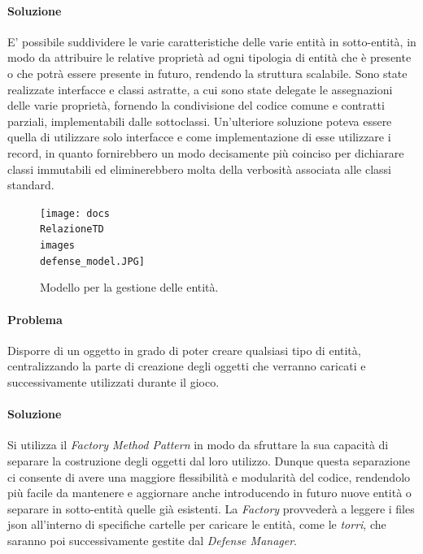 \documentclass[a4paper,12pt]{report}
\begin{document}
\paragraph{Soluzione}
E' possibile suddividere le varie caratteristiche delle varie entità in sotto-entità, in modo da attribuire le relative proprietà ad ogni tipologia di entità che è presente
o che potrà essere presente in futuro, rendendo la struttura scalabile. Sono state realizzate interfacce e classi astratte, a cui sono state delegate le assegnazioni delle varie proprietà, fornendo la condivisione del codice comune e contratti parziali, implementabili dalle sottoclassi.
Un'ulteriore soluzione poteva essere quella di utilizzare solo interfacce e come implementazione di esse utilizzare i record, in quanto fornirebbero un modo decisamente più coinciso per dichiarare classi immutabili ed eliminerebbero molta della verbosità associata alle classi standard.

\begin{figure}[H]
    \centering
    \texttt{[image: docs\\RelazioneTD\\images\\defense\_model.JPG]}
    \caption{Modello per la gestione delle entità.}
    \label{fig:defense-model}
\end{figure}

\vspace{15mm}

\paragraph{Problema}
Disporre di un oggetto in grado di poter creare qualsiasi tipo di entità, centralizzando la parte di creazione degli oggetti che verranno caricati e successivamente utilizzati durante il gioco.

\paragraph{Soluzione}
Si utilizza il \textit{Factory Method Pattern} in modo da sfruttare la sua capacità di separare la costruzione degli oggetti dal loro utilizzo. Dunque questa separazione ci consente di avere una maggiore flessibilità e modularità del codice, rendendolo più facile da mantenere e aggiornare anche introducendo in futuro nuove entità o separare in sotto-entità quelle già esistenti. 
La \textit{Factory} provvederà a leggere i files json all'interno di specifiche cartelle per caricare
le entità, come le \textit{torri}, che saranno poi successivamente gestite dal \textit{Defense Manager}.
\end{document}
